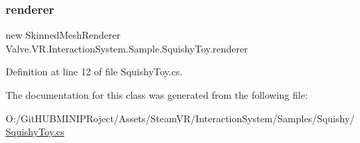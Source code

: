 \subsubsection{\texorpdfstring{renderer}{renderer}}
{\footnotesize\ttfamily new Skinned\+Mesh\+Renderer Valve.\+V\+R.\+Interaction\+System.\+Sample.\+Squishy\+Toy.\+renderer}



Definition at line 12 of file Squishy\+Toy.\+cs.



The documentation for this class was generated from the following file\+:\begin{DoxyCompactItemize}
\item 
O\+:/\+Git\+H\+U\+B\+M\+I\+N\+I\+P\+Roject/\+Assets/\+Steam\+V\+R/\+Interaction\+System/\+Samples/\+Squishy/\mbox{\hyperlink{_squishy_toy_8cs}{Squishy\+Toy.\+cs}}\end{DoxyCompactItemize}
